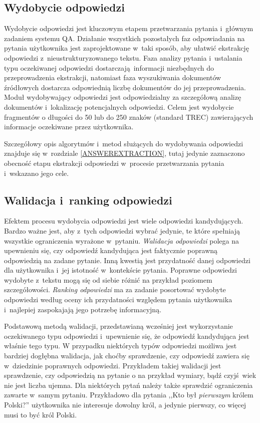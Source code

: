 \documentclass[a4paper, twoside, openright, 12pt]{report}
\begin{document}
        \subsection{Wydobycie odpowiedzi}
            Wydobycie odpowiedzi jest kluczowym etapem przetwarzania pytania i~głównym zadaniem systemu QA. Działanie
            wszystkich pozostałych faz odpowiadania na pytania użytkownika jest zaprojektowane w~taki sposób, aby
            ułatwić ekstrakcję odpowiedzi z~nieustrukturyzowanego tekstu. Faza analizy pytania i~ustalania typu oczekiwanej
            odpowiedzi dostarczają informacji niezbędnych do przeprowadzenia ekstrakcji, natomiast faza wyszukiwania
            dokumentów źródłowych dostarcza odpowiednią liczbę dokumentów do jej przeprowadzenia. Moduł wydobywający
            odpowiedzi jest odpowiedzialny za szczegółową analizę dokumentów i~lokalizację potencjalnych odpowiedzi.
            Celem jest wydobycie fragmentów o długości do 50 lub do 250 znaków (standard TREC) zawierających informacje
            oczekiwane przez użytkownika.

            Szczegółowy opis algorytmów i~metod służących do wydobywania odpowiedzi znajduje się w~rozdziale
            \ref{ANSWEREXTRACTION}, tutaj jedynie zaznaczono obecność etapu ekstrakcji odpowiedzi w~procesie przetwarzania
            pytania i~wskazano jego cele.

        \subsection{Walidacja i~ranking odpowiedzi}
            Efektem procesu wydobycia odpowiedzi jest wiele odpowiedzi kandydujących. Bardzo ważne jest, aby z~tych
            odpowiedzi wybrać jedynie, te które spełniają wszystkie ograniczenia wyrażone w~pytaniu. \emph{Walidacja odpowiedzi}
            polega na upewnieniu się, czy odpowiedź kandydująca jest faktycznie poprawną odpowiedzią na zadane pytanie.
            Inną kwestią jest przydatność danej odpowiedzi dla użytkownika i~jej istotność w~kontekście pytania.
            Poprawne odpowiedzi wydobyte z~tekstu mogą się od siebie różnić na przykład poziomem szczegółowości.
            \emph{Ranking odpowiedzi} ma za zadanie posortować wydobyte odpowiedzi według oceny ich przydatności
            względem pytania użytkownika i~najlepiej zaspokajają jego potrzebę informacyjną.

             Podstawową metodą walidacji, przedstawianą wcześniej jest wykorzystanie
            oczekiwanego typu odpowiedzi i~upewnienie się, że odpowiedź kandydująca jest właśnie tego typu. W przypadku
            niektórych typów odpowiedzi możliwa jest bardziej dogłębna walidacja, jak choćby sprawdzenie, czy odpowiedź
            zawiera się w~dziedzinie poprawnych odpowiedzi. Przykładem takiej walidacji jest sprawdzenie, czy odpowiedzią
            na pytanie o na przykład wymiary, bądź czyjś wiek nie jest liczba ujemna. Dla niektórych pytań należy
            także sprawdzić ograniczenia zawarte w~samym pytaniu. Przykładowo dla pytania ,,Kto był \emph{pierwszym} królem
            Polski?'' użytkownika nie interesuje dowolny król, a jedynie pierwszy, co więcej musi to być król Polski.
\end{document}
